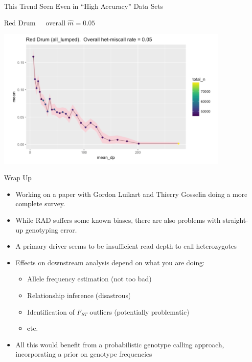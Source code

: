 \documentclass[letter,graphicx]{beamer}
\begin{document}
\begin{frame}{This Trend Seen Even in ``High Accuracy'' Data Sets}

\begin{center}
Red Drum~~~overall $\hat{m} = 0.05$
\vspace*{1.5em}

\includegraphics[width=0.87\textwidth]{./images/red-drum-dp.png}
\end{center}
\end{frame}




\begin{frame}{Wrap Up}
\begin{itemize}
\item Working on a paper with Gordon Luikart and Thierry Gosselin doing a 
more complete survey.  
\item While RAD suffers some known biases, there are also problems
with straight-up genotyping error.
\item A primary driver seems to be insufficient read depth to call heterozygotes
\item Effects on downstream analysis depend on what you are doing:
\begin{itemize}
\item Allele frequency estimation (not too bad)
\item Relationship inference (disastrous)
\item Identification of $F_{ST}$ outliers (potentially problematic)
\item etc.
\end{itemize}
\item All this would benefit from a probabilistic genotype calling approach, incorporating a prior on 
genotype frequencies
\end{itemize}
\end{frame}
\end{document}
